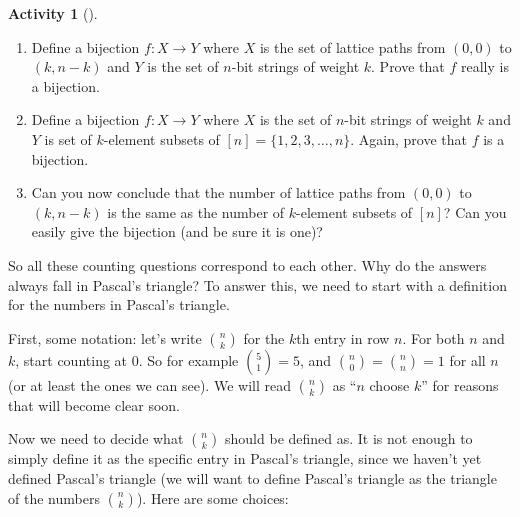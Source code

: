 \documentclass[10pt,]{book}
\theoremstyle{plain}
\theoremstyle{definition}
\theoremstyle{definition}
\theoremstyle{definition}
\newtheorem{activity}[project]{Activity}
\numberwithin{equation}{chapter}
\begin{document}
\par
\hypertarget{p-519}{}%
%
\begin{activity}[]\label{activity-63}
\leavevmode%
\begin{enumerate}[font=\bfseries,label=(\alph*),ref=\alph*]
\item\label{task-95} \hypertarget{p-520}{}%
Define a bijection \(f:X \to Y\) where \(X\) is the set of lattice paths from \((0,0)\) to \((k,n-k)\) and \(Y\) is the set of \(n\)-bit strings of weight \(k\). Prove that \(f\) really is a bijection.%
\item\label{task-96} \hypertarget{p-521}{}%
Define a bijection \(f:X \to Y\) where \(X\) is the set of \(n\)-bit strings of weight \(k\) and \(Y\) is set of \(k\)-element subsets of \([n] = \{1,2,3,\ldots, n\}\).  Again, prove that \(f\) is a bijection.%
\item\label{task-97} \hypertarget{p-522}{}%
Can you now conclude that the number of lattice paths from \((0,0)\) to \((k,n-k)\) is the same as the number of \(k\)-element subsets of \([n]\)?  Can you easily give the bijection (and be sure it is one)?%
\end{enumerate}
\end{activity}
\hypertarget{p-523}{}%
So all these counting questions correspond to each other.  Why do the answers always fall in Pascal's triangle?  To answer this, we need to start with a definition for the numbers in Pascal's triangle.%
\par
\hypertarget{p-524}{}%
First, some notation: let's write \(\binom{n}{k}\) for the \(k\)th entry in row \(n\).  For both \(n\) and \(k\), start counting at 0.  So for example \(\binom{5}{1} = 5\), and \(\binom{n}{0} = \binom{n}{n} = 1\) for all \(n\) (or at least the ones we can see).  We will read \(\binom{n}{k}\) as ``\(n\) choose \(k\)'' for reasons that will become clear soon.%
\par
\hypertarget{p-525}{}%
Now we need to decide what \(\binom{n}{k}\) should be defined as.  It is not enough to simply define it as the specific entry in Pascal's triangle, since we haven't yet defined Pascal's triangle (we will want to define Pascal's triangle as the triangle of the numbers \(\binom{n}{k}\)).  Here are some choices:%
\end{document}
